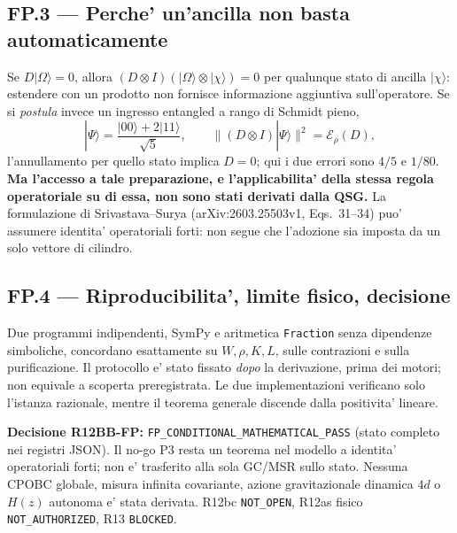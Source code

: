 \documentclass[11pt,a4paper]{article}
\begin{document}
\subsection*{FP.3 --- Perche' un'ancilla non basta automaticamente}
Se $D|\Omega\rangle=0$, allora $(D\otimes I)(|\Omega\rangle\otimes|\chi\rangle)=0$ per qualunque stato di ancilla $|\chi\rangle$: estendere con un prodotto non fornisce informazione aggiuntiva sull'operatore. Se si \emph{postula} invece un ingresso entangled a rango di Schmidt pieno,
\begin{equation}
|\Psi\rangle=\frac{|00\rangle+2|11\rangle}{\sqrt5},\qquad
\|(D\otimes I)|\Psi\rangle\|^2=\mathcal E_\rho(D),\tag{FP.8}
\end{equation}
l'annullamento per quello stato implica $D=0$; qui i due errori sono $4/5$ e $1/80$. \textbf{Ma l'accesso a tale preparazione, e l'applicabilita' della stessa regola operatoriale su di essa, non sono stati derivati dalla QSG.} La formulazione di Srivastava--Surya (arXiv:2603.25503v1, Eqs.~31--34) puo' assumere identita' operatoriali forti: non segue che l'adozione sia imposta da un solo vettore di cilindro.

\subsection*{FP.4 --- Riproducibilita', limite fisico, decisione}
Due programmi indipendenti, SymPy e aritmetica \texttt{Fraction} senza dipendenze simboliche, concordano esattamente su $W,\rho,K,L$, sulle contrazioni e sulla purificazione. Il protocollo e' stato fissato \emph{dopo} la derivazione, prima dei motori; non equivale a scoperta preregistrata. Le due implementazioni verificano solo l'istanza razionale, mentre il teorema generale discende dalla positivita' lineare.

\textbf{Decisione R12BB-FP:} \texttt{FP\_CONDITIONAL\_MATHEMATICAL\_PASS} (stato completo nei registri JSON). Il no-go P3 resta un teorema nel modello a identita' operatoriali forti; non e' trasferito alla sola GC/MSR sullo stato. Nessuna CPOBC globale, misura infinita covariante, azione gravitazionale dinamica $4d$ o $H(z)$ autonoma e' stata derivata. R12bc \texttt{NOT\_OPEN}, R12as fisico \texttt{NOT\_AUTHORIZED}, R13 \texttt{BLOCKED}.\par
\endgroup

\clearpage
\begingroup
\setlength{\parskip}{0.16em}
\end{document}
